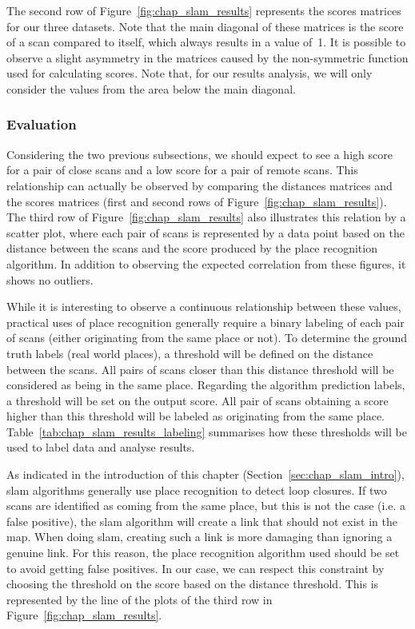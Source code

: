 The second row of Figure~\ref{fig:chap_slam_results} represents the scores matrices for our three datasets. Note that the main diagonal of these matrices is the score of a scan compared to itself, which always results in a value of~1. It is possible to observe a slight asymmetry in the matrices caused by the non-symmetric function used for calculating scores. Note that, for our results analysis, we will only consider the values from the area below the main diagonal.


\subsubsection{Evaluation}
\label{ssec:chap_slam_results_evaluation}

Considering the two previous subsections, we should expect to see a high score for a pair of close scans and a low score for a pair of remote scans. This relationship can actually be observed by comparing the distances matrices and the scores matrices (first and second rows of Figure~\ref{fig:chap_slam_results}). The third row of Figure~\ref{fig:chap_slam_results} also illustrates this relation by a scatter plot, where each pair of scans is represented by a data point based on the distance between the scans and the score produced by the place recognition algorithm. In addition to observing the expected correlation from these figures, it shows no outliers.

While it is interesting to observe a continuous relationship between these values, practical uses of place recognition generally require a binary labeling of each pair of scans (either originating from the same place or not). To determine the ground truth labels (real world places), a threshold will be defined on the distance between the scans. All pairs of scans closer than this distance threshold will be considered as being in the same place. Regarding the algorithm prediction labels, a threshold will be set on the output score. All pair of scans obtaining a score higher than this threshold will be labeled as originating from the same place. Table~\ref{tab:chap_slam_results_labeling} summarises how these thresholds will be used to label data and analyse results.

As indicated in the introduction of this chapter (Section~\ref{sec:chap_slam_intro}), \gls*{slam} algorithms generally use place recognition to detect loop closures. If two scans are identified as coming from the same place, but this is not the case (i.e. a false positive), the \gls*{slam} algorithm will create a link that should not exist in the map. When doing \gls*{slam}, creating such a link is more damaging than ignoring a genuine link. For this reason, the place recognition algorithm used should be set to avoid getting false positives. In our case, we can respect this constraint by choosing the threshold on the score based on the distance threshold. This is represented by the line of the plots of the third row in Figure~\ref{fig:chap_slam_results}.

